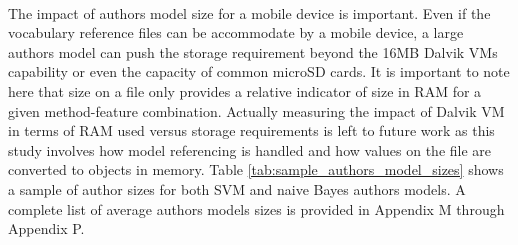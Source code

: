 	\paragraph*{} The impact of authors model size for a mobile device is important. Even if the vocabulary reference files can be accommodate by a mobile device, a large authors model can push the storage requirement beyond the 16MB Dalvik VMs capability or even the capacity of common microSD cards.  It is important to note here that size on a file only provides a relative indicator of size in RAM for a given method-feature combination.  Actually measuring the impact of Dalvik VM in terms of RAM used versus storage requirements is left to future work as this study involves how model referencing is handled and how values on the file are converted to objects in memory. Table \ref{tab:sample_authors_model_sizes} shows a sample of author sizes for both SVM and naive Bayes authors models.  A complete list of average authors models sizes is provided in Appendix M through Appendix P.
	
